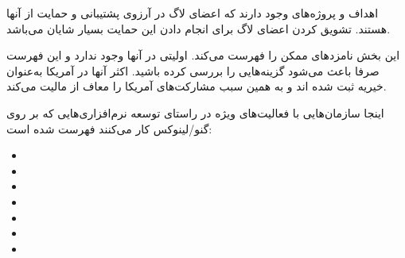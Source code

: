اهداف و پروژه‌های وجود دارند که اعضای لاگ در آرزوی پشتیبانی و حمایت از آنها هستند.
تشویق کردن اعضای لاگ برای انجام دادن این حمایت بسیار شایان می‌باشد.

این بخش نامزد‌های ممکن را فهرست می‌کند. اولیتی در آنها وجود ندارد و این فهرست
صرفا باعث می‌شود گزینه‌هایی را بررسی کرده باشید. اکثر آنها در آمریکا به‌عنوان
خیریه ثبت شده اند و به همین سبب مشارکت‌های آمریکا را معاف از مالیت می‌کند.

اینجا سازمان‌هایی با فعالیت‌های ویژه در راستای توسعه نرم‌افزاری‌هایی که
بر روی گنو/لینوکس کار می‌کنند فهرست شده است:

\begin{itemize}
\item
{}

\item
{}

\item
{}

\item
{}

\item
{}

\item
{}

\item 
{}
\end{itemize}

